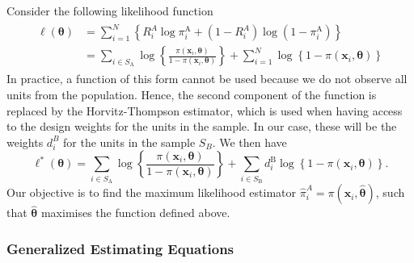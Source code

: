 \documentclass[
]{jss}
\begin{document}
Consider the following likelihood function \begin{align}
    \begin{split}
 \ell(\boldsymbol{\theta}) & =\sum_{i=1}^N\left\{R_i^A \log \pi_i^{\mathrm{A}}+\left(1-R_i^A\right) \log \left(1-\pi_i^{\mathrm{A}}\right)\right\} \\ & =\sum_{i \in S_{\mathrm{A}}} \log \left\{\frac{\pi\left(\boldsymbol{x}_i, \boldsymbol{\theta}\right)}{1-\pi\left(\boldsymbol{x}_i, \boldsymbol{\theta}\right)}\right\}+\sum_{i=1}^N \log \left\{1-\pi\left(\boldsymbol{x}_i, \boldsymbol{\theta}\right)\right\}
    \end{split}
\end{align} In practice, a function of this form cannot be used because
we do not observe all units from the population. Hence, the second
component of the function is replaced by the Horvitz-Thompson estimator,
which is used when having access to the design weights for the units in
the sample. In our case, these will be the weights \(d_i^B\) for the
units in the sample \(S_B\). We then have \begin{equation}
\ell^*(\boldsymbol{\theta})=\sum_{i \in S_{\mathrm{A}}} \log \left\{\frac{\pi\left(\boldsymbol{x}_i, \boldsymbol{\theta}\right)}{1-\pi\left(\boldsymbol{x}_i, \boldsymbol{\theta}\right)}\right\}+\sum_{i \in S_{\mathrm{B}}} d_i^{\mathrm{B}} \log \left\{1-\pi\left(\boldsymbol{x}_i, \boldsymbol{\theta}\right)\right\}.
\end{equation} Our objective is to find the maximum likelihood estimator
\(\hat{\pi}_{i}^{A} = \pi(\boldsymbol{x}_{i}, \hat{\boldsymbol{\theta}})\),
such that \(\hat{\boldsymbol{\theta}}\) maximises the function defined
above.

\subsubsection{Generalized Estimating Equations}\label{sec-ipw-gee}
\end{document}

